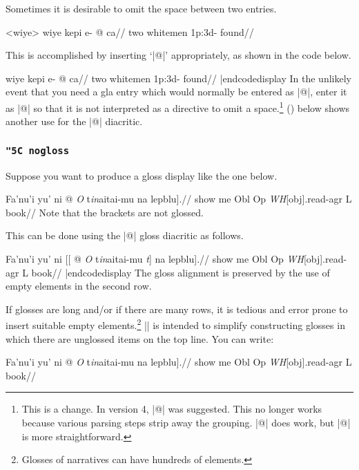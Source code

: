 %
Sometimes it is desirable to omit the space between two entries.

\framedisplay
\ex<wiye>
\begingl
\gla wiye kepi e- @ ca//
\glb two whitemen {\sc 1p:3d}- found//
\endgl
\xe
\endframedisplay

This is accomplished by inserting `|@|' appropriately, as shown
in the code below.

\codedisplay
\ex
\begingl
\gla wiye kepi e- @ ca//
\glb two whitemen {\sc 1p:3d}- found//
\endgl
\xe
|endcodedisplay
In the unlikely event that you need a gla entry which
would normally be entered as |@|, enter it as |{\relax @}|
so that it is not interpreted as a directive to omit a
space.\footnote{This is a change.  In version 4, |{{@}}| was
suggested.  This no longer works because various parsing steps strip
away the grouping.  |{{{{@}}}}| does work, but |{\relax @}| is more straightforward.}
() below shows another use for the |@| diacritic.

\exbreak
\subsubsection {\tt \char"5C nogloss}

Suppose you want to produce a gloss display like the one below.

\framedisplay
{}
\begingl
\gla Fa'nu'i yu' ni \nogloss{[[} @ {\it O} t{\it in\/}aitai-mu
\nogloss{{\it t\/}]} na {lepblu].}//
\glb show me Obl Op {\it WH\/}[obj].read-agr L book//
\endgl
\xe
\endframedisplay
\noindent Note that the brackets are not glossed.

This can be done using the |@| gloss diacritic as follows.

\codedisplay
{}
\begingl
\gla Fa'nu'i yu' ni {[[} @ {\it O} t{\it in\/}aitai-mu
{{\it t\/}]} na {lepblu].}//
\glb show me Obl {} Op {\it WH\/}[obj].read-agr {} L book//
\endgl
\xe
|endcodedisplay
\noindent The gloss alignment is preserved by the use of empty elements in
the second row.

If glosses are long and/or if there are many rows, it is tedious and
error prone to insert suitable empty elements.\footnote{Glosses of
narratives can have hundreds of elements.} |\nogloss| is intended to
simplify constructing glosses in which there are unglossed items on
the top line.  You can write:

\framedisplay
{}
\begingl
\gla Fa'nu'i yu' ni \nogloss{[[} @ {\it O} t{\it in\/}aitai-mu
\nogloss{{\it t\/}]} na {lepblu].}//
\glb show me Obl Op {\it WH\/}[obj].read-agr L book//
\endgl
\xe
\endframedisplay

